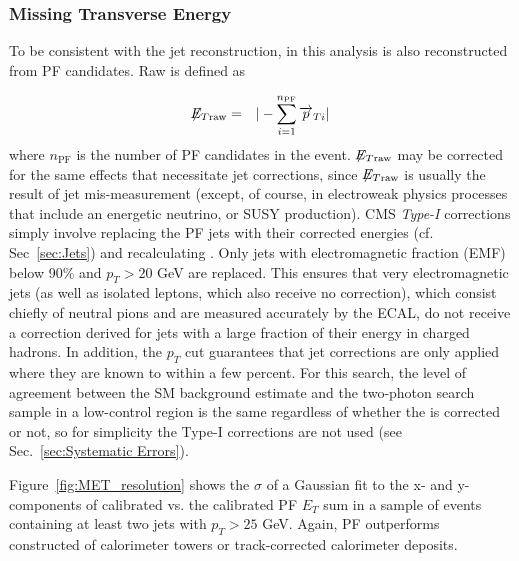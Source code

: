 \documentclass[dissertation.tex]{subfiles}
\begin{document}
\subsubsection{Missing Transverse Energy}
\label{sec:MET}

To be consistent with the jet reconstruction, \MET in this analysis is also reconstructed from PF candidates.  Raw \MET is defined as

\begin{eqnarray}
\not\!\! E_{T\mathrm{raw}} &=& |-\sum_{i = 1}^{n_{\mathrm{PF}}}\overrightarrow{p}_{Ti}|
\end{eqnarray}
%
where $n_{\mathrm{PF}}$ is the number of PF candidates in the event.  $\not\!\! E_{T\mathrm{raw}}$ may be corrected for the same effects that necessitate jet corrections, since $\not\!\! E_{T\mathrm{raw}}$ is usually the result of jet mis-measurement (except, of course, in electroweak physics processes that include an energetic neutrino, or SUSY production).  CMS \textit{Type-I} \MET corrections simply involve replacing the PF jets with their corrected energies (cf. Sec~\ref{sec:Jets}) and recalculating \MET.  Only jets with electromagnetic fraction (EMF) below 90\% and $p_{T} > 20$ GeV are replaced.  \marginpar{\textcolor{blue}{Removed italics in ``electromagnetic fraction"}}This ensures that very electromagnetic jets (as well as isolated leptons, which also receive no correction), which consist chiefly of neutral pions and are measured accurately by the ECAL, do not receive a correction derived for jets with a large fraction of their energy in charged hadrons.  In addition, the $p_{T}$ cut guarantees that jet corrections are only applied where they are known to within a few percent.  For this search, the level of agreement between the SM background estimate and the two-photon search sample in a low-\MET control region is the same regardless of whether the \MET is corrected or not, so for simplicity the Type-I \MET corrections are not used (see Sec.~\ref{sec:Systematic Errors}).

Figure~\ref{fig:MET_resolution} shows the $\sigma$ of a Gaussian fit to the x- and y-components of calibrated \MET vs. the calibrated PF $E_{T}$ sum in a sample of events containing at least two jets with $p_{T} > 25$ GeV.  Again, PF \MET outperforms \MET constructed of calorimeter towers or track-corrected calorimeter deposits.
\end{document}
